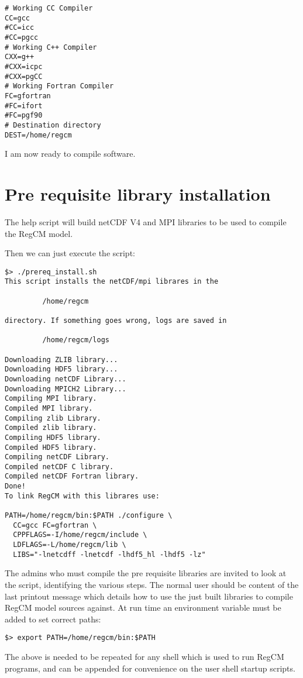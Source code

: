 \begin{Verbatim}
# Working CC Compiler
CC=gcc
#CC=icc
#CC=pgcc
# Working C++ Compiler
CXX=g++
#CXX=icpc
#CXX=pgCC
# Working Fortran Compiler
FC=gfortran
#FC=ifort
#FC=pgf90
# Destination directory
DEST=/home/regcm
\end{Verbatim}

I am now ready to compile software.

\section{Pre requisite library installation}

The help script will build netCDF V4 and MPI libraries to be used to
compile the RegCM model.

Then we can just execute the script:

\begin{Verbatim}
$> ./prereq_install.sh
This script installs the netCDF/mpi librares in the

         /home/regcm

directory. If something goes wrong, logs are saved in

         /home/regcm/logs

Downloading ZLIB library...
Downloading HDF5 library...
Downloading netCDF Library...
Downloading MPICH2 Library...
Compiling MPI library.
Compiled MPI library.
Compiling zlib Library.
Compiled zlib library.
Compiling HDF5 library.
Compiled HDF5 library.
Compiling netCDF Library.
Compiled netCDF C library.
Compiled netCDF Fortran library.
Done!
To link RegCM with this librares use:

PATH=/home/regcm/bin:$PATH ./configure \
  CC=gcc FC=gfortran \
  CPPFLAGS=-I/home/regcm/include \
  LDFLAGS=-L/home/regcm/lib \
  LIBS="-lnetcdff -lnetcdf -lhdf5_hl -lhdf5 -lz"

\end{Verbatim}

The admins who must compile the pre requisite libraries are invited to look
at the script, identifying the various steps.
The normal user should be content of the last printout message which details
how to use the just built libraries to compile RegCM model sources against.
At run time an environment variable must be added to set correct paths:

\begin{Verbatim}
$> export PATH=/home/regcm/bin:$PATH
\end{Verbatim}

The above is needed to be repeated for any shell which is used to run
RegCM programs, and can be appended for convenience on the user shell
startup scripts.
